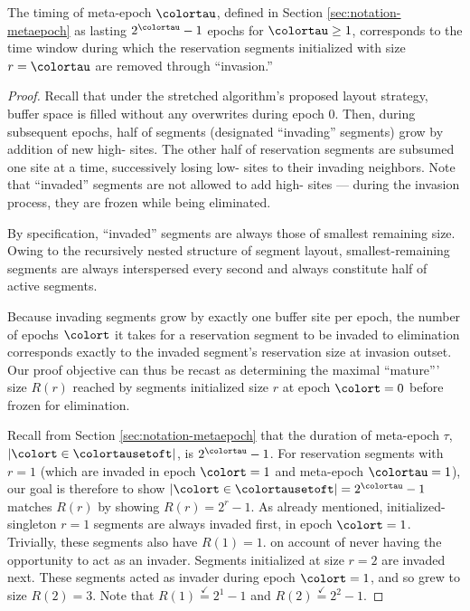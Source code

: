 \begin{lemma}
\label{thm:stretched-meta-epoch}

The timing of meta-epoch $\colortau$, defined in Section \ref{sec:notation-metaepoch} as lasting $2^{\colortau} - 1$ epochs for $\colortau\geq1$, corresponds to the time window during which the reservation segments initialized with size $r=\colortau$ are removed through ``invasion.''
\end{lemma}

\begin{proof}

Recall that under the stretched algorithm's proposed layout strategy, buffer space is filled without any overwrites during epoch 0.
Then, during subsequent epochs, half of segments (designated ``invading'' segments) grow by addition of new high-\hv{} sites.
The other half of reservation segments are subsumed one site at a time, successively losing low-\hv{} sites to their invading neighbors.
Note that ``invaded'' segments are not allowed to add high-\hv{} sites --- during the invasion process, they are frozen while being eliminated.

By specification, ``invaded'' segments are always those of smallest remaining size.
Owing to the recursively nested structure of segment layout, smallest-remaining segments are always interspersed every second and always constitute half of active segments.

Because invading segments grow by exactly one buffer site per epoch, the number of epochs $\colort$ it takes for a reservation segment to be invaded to elimination corresponds exactly to the invaded segment's reservation size at invasion outset.
Our proof objective can thus be recast as determining the maximal ``mature''' size $R(r)$ reached by segments initialized size $r$ at epoch $\colort=0$ before frozen for elimination.

Recall from Section \ref{sec:notation-metaepoch} that the duration of meta-epoch $\tau$, $|\colort \in \colortausetoft|$, is $2^{\colortau} - 1$.
For reservation segments with $r=1$ (which are invaded in epoch $\colort=1$ and meta-epoch $\colortau = 1$), our goal is therefore to show $|\colort \in \colortausetoft| = 2^{\colortau} - 1$ matches $R(r)$ by showing $R(r) = 2^{r} - 1$.
As already mentioned, initialized-singleton $r=1$ segments are always invaded first, in epoch $\colort=1$.
Trivially, these segments also have $R(1) = 1$. on account of never having the opportunity to act as an invader.
Segments initialized at size $r=2$ are invaded next.
These segments acted as invader during epoch $\colort=1$, and so grew to size $R(2) = 3$.
Note that $R(1) \stackrel{\checkmark}{=} 2^1 - 1$ and $R(2) \stackrel{\checkmark}{=} 2^2 - 1$.


\end{proof}
